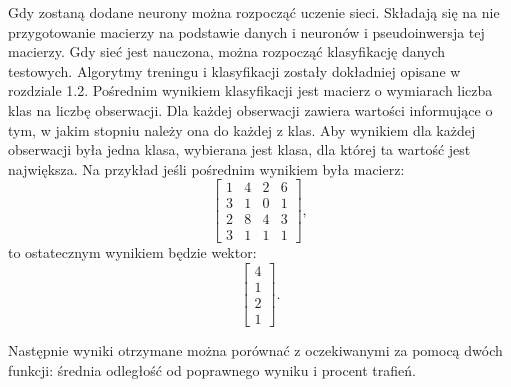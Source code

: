 \documentclass{article}
\begin{document}
Gdy zostaną dodane neurony można rozpocząć uczenie sieci. 
Składają się na nie przygotowanie macierzy na podstawie danych i neuronów i pseudoinwersja tej macierzy. 
Gdy sieć jest nauczona, można rozpocząć klasyfikację danych testowych.
Algorytmy treningu i klasyfikacji zostały dokładniej opisane w rozdziale 1.2.
Pośrednim wynikiem klasyfikacji jest macierz o wymiarach liczba klas na liczbę obserwacji.
Dla każdej obserwacji zawiera wartości informujące o tym, w jakim stopniu należy ona do każdej z klas.
Aby wynikiem dla każdej obserwacji była jedna klasa, wybierana jest klasa, dla której ta wartość jest największa.
Na przykład jeśli pośrednim wynikiem była macierz:
\[ \begin{bmatrix} 1&4&2&6 \\ 3&1&0&1 \\ 2&8&4&3 \\ 3&1&1&1 \end{bmatrix},\]
to ostatecznym wynikiem będzie wektor:
\[ \begin{bmatrix} 4 \\ 1 \\ 2 \\ 1 \end{bmatrix}.\]

Następnie wyniki otrzymane można porównać z oczekiwanymi za pomocą dwóch funkcji: średnia odległość od poprawnego wyniku i procent trafień.
\end{document}
